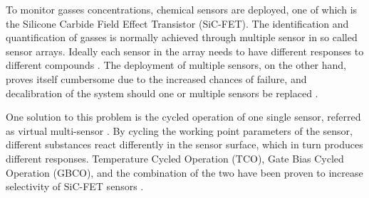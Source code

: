 To monitor gasses concentrations, chemical sensors are deployed, one of which is the Silicone Carbide Field Effect Transistor (SiC-FET). The identification and quantification of gasses is normally achieved through multiple sensor in so called sensor arrays. Ideally each sensor in the array needs to have different responses to different compounds \cite{Bastuck_2019}. The deployment of multiple sensors, on the other hand, proves itself cumbersome due to the increased chances of failure, and decalibration of the system should one or multiple sensors be replaced \cite{Bastuck_2019}.

One solution to this problem is the cycled operation of one single sensor, referred as virtual multi-sensor \cite{Bastuck_2019}. By cycling the working point parameters of the sensor, different substances react differently in the sensor surface, which in turn produces different responses. Temperature Cycled Operation (TCO), Gate Bias Cycled Operation (GBCO), and the combination of the two have been proven to increase selectivity of SiC-FET sensors \cite{Bastuck_2019}.




